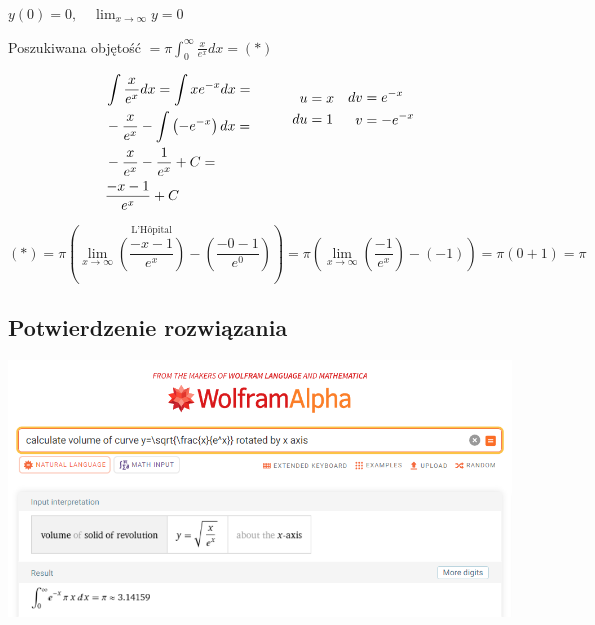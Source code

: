 \documentclass[12pt]{article}
\begin{document}
$\displaystyle y(0) = 0,\quad \lim_{x\to\infty}y=0\quad$

Poszukiwana objętość $\displaystyle = \pi\int_0^\infty \frac{x}{e^x} dx= (*)$

\begin{equation*}
    \begin{aligned}[c]
        &\int \frac{x}{e^x} dx = \int xe^{-x} dx = \\
        &-\frac{x}{e^x} - \int \left( -e^{-x} \right) dx = \\
        &-\frac{x}{e^x} - \frac{1}{e^x} + C = \\
        &\frac{-x-1}{e^x} + C
    \end{aligned} \quad\quad\quad
    \begin{aligned} 
        &\begin{aligned}[c]
            u &= x \\
            du &= 1 \\    
        \end{aligned} \quad
        \begin{aligned}[c]
            dv &= e^{-x}\\
            v &= -e^{-x} \\    
        \end{aligned} \\
        &\text{\phantom{-}} \\ &\text{\phantom{-}} \\ &\text{\phantom{-}} \\
    \end{aligned}
\end{equation*}

\[(*) = \pi\left(\lim_{x\to\infty}\stackrel{\text{L'Hôpital}}{\left(\frac{-x-1}{e^x}\right)} - \left(\frac{-0-1}{e^0}\right) \right) = \pi \left(\lim_{x\to\infty}\left(\frac{-1}{e^x}\right) -(-1)\right) = \pi (0 + 1) = \pi \]

\subsection{Potwierdzenie rozwiązania}
\includegraphics[scale=0.425]{am_3.png}
\end{document}
